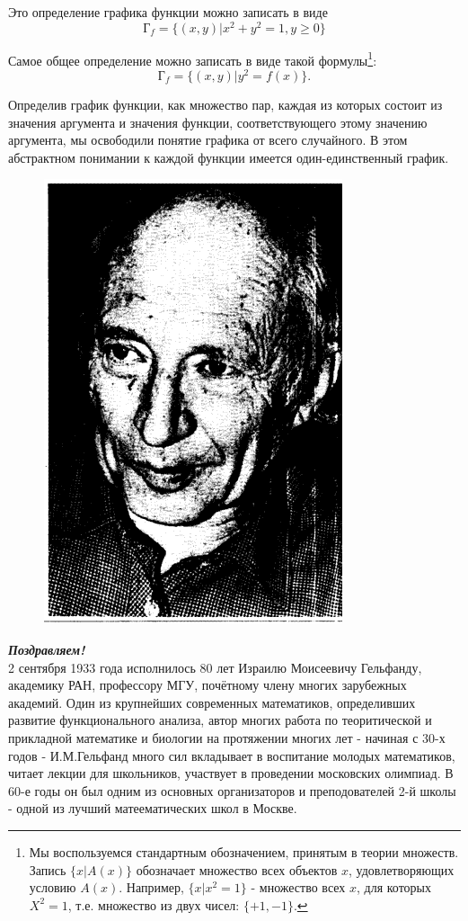 Это определение графика функции можно записать в виде
\[Г_f = \{(x, y)| x^2 + y^2 = 1, y \geq 0\}\]

Самое общее определение можно записать в виде такой формулы\footnote{Мы воспользуемся стандартным обозначением, принятым в теории множеств. Запись $\{x| A(x)\}$ обозначает множество всех объектов $x$, удовлетворяющих условию $A(x)$. Например, $\{x| x^2 = 1\}$ - множество всех $x$, для которых $X^2 = 1$, т.е. множество из двух чисел: $\{+1, -1\}$.}:
\[Г_f = \{(x, y)| y^2 = f(x)\}.\]

Определив график функции, как множество пар, каждая из которых состоит из значения аргумента и значения функции, соответствующего этому значению аргумента, мы освободили понятие графика от всего случайного. В этом абстрактном понимании к каждой функции имеется один-единственный график.

\newpage 
\onecolumn

\begin{figure}
  \begin{center}
    \includegraphics[scale=0.6]{photo.png}
  \end{center}
\end{figure}

\textit{\textbf{Поздравляем!}}
\\2 сентября 1933 года исполнилось 80 лет $\textit{Израилю Моисеевичу Гельфанду}$, академику РАН, профессору МГУ, почётному члену многих зарубежных академий. Один из крупнейших современных математиков, определивших развитие функционального анализа, автор многих работа по теоритической и прикладной математике и биологии на протяжении многих лет - начиная с 30-х годов - $\textit{И.М.Гельфанд}$ много сил вкладывает в воспитание молодых математиков, читает лекции для школьников, участвует в проведении московских олимпиад. В 60-е годы он был одним из основных организаторов и преподователей 2-й школы - одной из лучший матеематических школ в Москве.